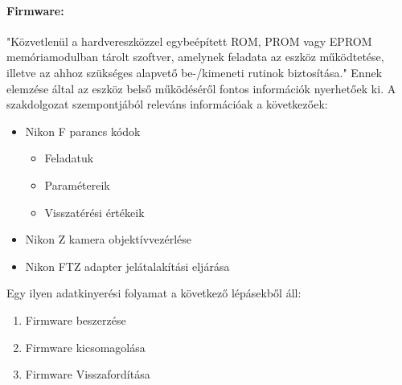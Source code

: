 \paragraph{Firmware:} "Közvetlenül a hardvereszközzel egybeépített ROM, PROM vagy EPROM memóriamodulban tárolt szoftver,
amelynek feladata az eszköz működtetése, illetve az ahhoz szükséges alapvető be-/kimeneti rutinok biztosítása."\cite{tamas2019celzzott_firmware_def}
Ennek elemzése által az eszköz belső működéséről fontos információk nyerhetőek ki.
A szakdolgozat szempontjából releváns információak a következőek:
\begin{itemize}
    \item Nikon F parancs kódok
    \begin{itemize}
        \item Feladatuk
        \item Paramétereik
        \item Visszatérési értékeik
    \end{itemize}
    \item Nikon Z kamera objektívvezérlése
    \item Nikon FTZ adapter jelátalakítási eljárása
\end{itemize}
Egy ilyen adatkinyerési folyamat a következő lépásekből áll:
\begin{enumerate}
    \item Firmware beszerzése
    \item Firmware kicsomagolása
    \item Firmware Visszafordítása
\end{enumerate}\cite{nadir2022taxonomy}
